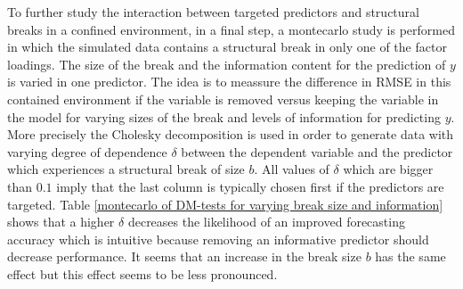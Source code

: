 \documentclass[12pt]{article}
\begin{document}
\clearpage

To further study the interaction between targeted predictors and structural breaks in a confined environment, in a final step, a montecarlo study is performed in which the simulated data contains a structural break in only one of the factor loadings. The size of the break and the information content for the prediction of $y$ is varied in one predictor. The idea is to meassure the difference in RMSE in this contained environment if the variable is removed versus keeping the variable in the model for varying sizes of the break and levels of information for predicting $y$. More precisely the Cholesky decomposition is used in order to generate data with varying degree of dependence $\delta$ between the dependent variable and the predictor which experiences a structural break of size $b$. All values of $\delta$ which are bigger than $0.1$ imply that the last column is typically chosen first if the predictors are targeted.
Table \ref{montecarlo of DM-tests for varying break size and information} shows that a higher $\delta$ decreases the likelihood of an improved forecasting accuracy which is intuitive because removing an informative predictor should decrease performance. It seems that an increase in the break size $b$ has the same effect but this effect seems to be less pronounced.
\end{document}

